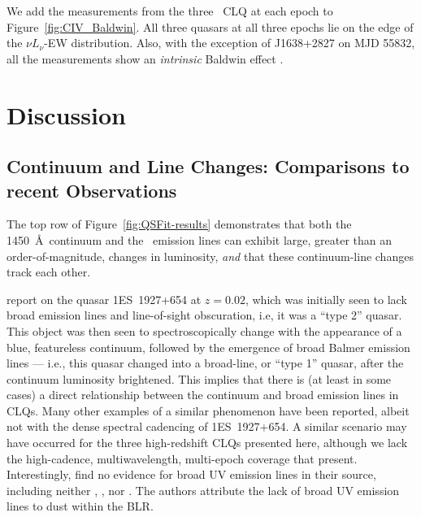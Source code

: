 \documentclass[fleqn,usenatbib]{mnras}
\begin{document}
We add the measurements from the three \civ\ CLQ at each epoch
to Figure~\ref{fig:CIV_Baldwin}. All three quasars at all three epochs
lie on the edge of the $\nu L_{\nu}$-EW distribution.  Also, with the
exception of J1638+2827 on MJD 55832, all the measurements show an
{\it intrinsic} Baldwin effect \citep[e.g.,][]{Goad2004, Rakic2017}.



\section{Discussion}
\subsection{Continuum and Line Changes: Comparisons to recent Observations}
The top row of Figure~\ref{fig:QSFit-results} demonstrates that both
the 1450~\AA\ continuum and the \civ\ emission lines can exhibit
large, greater than an order-of-magnitude, changes in luminosity, {\it
and} that these continuum-line changes track each other.

\citet{Trakhtenbrot2019} report on the quasar 1ES~1927+654 at
$z=0.02$, which was initially seen to lack broad emission lines and
line-of-sight obscuration, i.e, it was a ``type 2'' quasar. This
object was then seen to spectroscopically change with the appearance
of a blue, featureless continuum, followed by the emergence of broad
Balmer emission lines --- i.e., this quasar changed into a broad-line,
or ``type 1'' quasar, after the continuum luminosity brightened.  This
implies that there is (at least in some cases) a direct relationship
between the continuum and broad emission lines in CLQs.  Many other
examples of a similar phenomenon have been reported, albeit not with
the dense spectral cadencing of 1ES~1927+654.  A similar scenario may
have occurred for the three high-redshift CLQs presented here,
although we lack the high-cadence, multiwavelength, multi-epoch
coverage that \citet{Trakhtenbrot2019} present.  Interestingly,
\citet{Trakhtenbrot2019} find no evidence for broad UV emission lines
in their source, including neither \civ, \ciii, nor \mgii.  The
authors attribute the lack of broad UV emission lines to dust within
the BLR.
\end{document}
